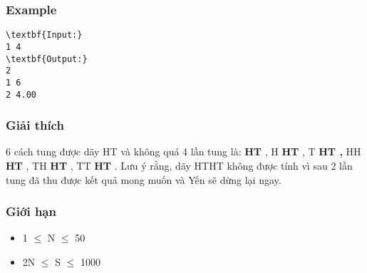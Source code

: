 \subsubsection{Example}
\begin{verbatim}
\textbf{Input:}
1 4
\textbf{Output:}
2
1 6
2 4.00\end{verbatim}

\subsubsection{Giải thích}

6 cách tung được dãy HT và không quá 4 lần tung là: \textbf{HT} , H \textbf{HT} , T \textbf{ HT , } HH \textbf{HT} , TH \textbf{HT} , TT \textbf{ HT} . Lưu ý rằng, dãy HTHT không được tính vì sau 2 lần tung đã thu được kết quả mong muốn và Yến sẽ dừng lại ngay.

\subsubsection{Giới hạn}
\begin{itemize}
	\item 1  $\le$  N  $\le$  50
	\item 2N  $\le$  S  $\le$  1000
\end{itemize}

\subsubsection{ }
